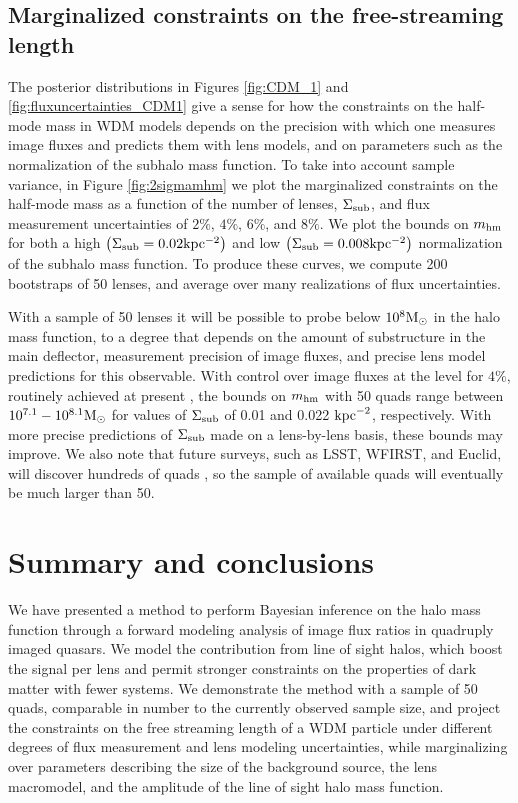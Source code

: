 \subsection{Marginalized constraints on the free-streaming length}
\label{ssec:marginalized}
The posterior distributions in Figures \ref{fig:CDM_1} and \ref{fig:fluxuncertainties_CDM1} give a sense for how the constraints on the half-mode mass in WDM models depends on the precision with which one measures image fluxes and predicts them with lens models, and on parameters such as the normalization of the subhalo mass function. To take into account sample variance, in Figure \ref{fig:2sigmamhm} we plot the marginalized constraints on the half-mode mass as a function of the number of lenses, $\Sigma_{\rm{sub}}$, and flux measurement uncertainties of $2\%$, $4\%$, $6\%$, and $8\%$. We plot the bounds on ${m_{\rm{hm}}}$ for both a high $\left(\Sigma_{\rm{sub}} = 0.02 \rm{kpc^{-2}}\right)$ and low $\left(\Sigma_{\rm{sub}} = 0.008 \rm{kpc^{-2}}\right)$ normalization of the subhalo mass function. To produce these curves, we compute 200 bootstraps of 50 lenses, and average over many realizations of flux uncertainties. 

With a sample of 50 lenses it will be possible to probe below $10^8 {\rm{M}_{\odot}}$ in the halo mass function, to a degree that depends on the amount of substructure in the main deflector, measurement precision of image fluxes, and precise lens model predictions for this observable. With control over image fluxes at the level for $4\%$, routinely achieved at present \cite{Nierenberg++14,Nierenberg++17}, the bounds on ${m_{\rm{hm}}}$ with 50 quads range between $10^{7.1} - 10^{8.1}{\rm{M}_{\odot}}$ for values of $\Sigma_{\rm{sub}}$ of 0.01 and 0.022 $\rm{kpc}^{-2}$, respectively. With more precise predictions of $\Sigma_{\rm{sub}}$ made on a lens-by-lens basis, these bounds may improve.  We also note that future surveys, such as LSST, WFIRST, and Euclid, will discover hundreds of quads \cite{OguriMarshall10}, so the sample of available quads will eventually be much larger than 50. 

\section{Summary and conclusions}
\label{sec:conclusion}
We have presented a method to perform Bayesian inference on the halo mass function through a forward modeling analysis of image flux ratios in quadruply imaged quasars. We model the contribution from line of sight halos, which boost the signal per lens and permit stronger constraints on the properties of dark matter with fewer systems. We demonstrate the method with a sample of 50 quads, comparable in number to the currently observed sample size, and project the constraints on the free streaming length of a WDM particle under different degrees of flux measurement and lens modeling uncertainties, while marginalizing over parameters describing the size of the background source, the lens macromodel, and the amplitude of the line of sight halo mass function. 

